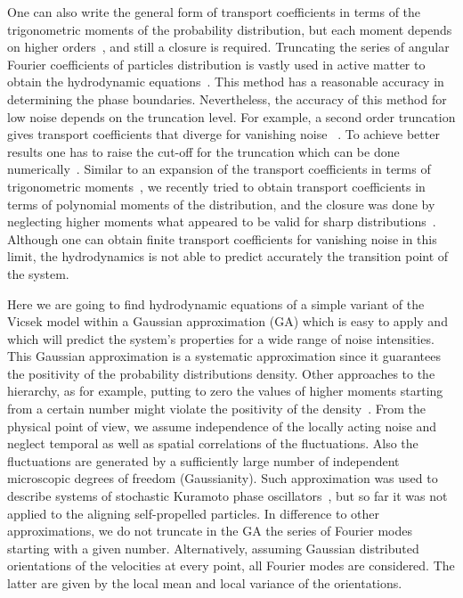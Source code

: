 \documentclass[reprint,floatfix,amsmath,amssymb,aps,pre,showkeys,showpacs,superscriptaddress]{revtex4-1}
\begin{document}
One can also write the general form of transport coefficients in terms of the trigonometric moments of the probability distribution, but each moment depends on higher orders~\cite{romanczuk2012swarming,romanczuk2012mean,Grossmann2012}, and still a closure is required. Truncating the series of angular Fourier coefficients of particles distribution is vastly used in active matter to obtain the hydrodynamic equations~\cite{Farrell2012,Grossmann2014,Yang2015,allaei2016}. This method has a reasonable accuracy in determining the phase boundaries. Nevertheless, the accuracy of this method for low noise depends on the truncation level. For example, a second order truncation gives transport coefficients that diverge for vanishing noise ~\cite{Farrell2012,allaei2016,Yang2015}. To achieve better results one has to raise the cut-off for the truncation which can be done numerically~\cite{Grossmann2013}. Similar to an expansion of the transport coefficients in terms of trigonometric moments~\cite{romanczuk2012swarming,romanczuk2012mean,Grossmann2012}, we recently tried to obtain transport coefficients in terms of polynomial moments of the distribution, and the closure was done by neglecting higher moments what appeared to be valid for sharp distributions~\cite{allaei2016}. Although one can obtain finite transport coefficients for vanishing noise in this limit, the hydrodynamics is not able to predict accurately the transition point of the system.

Here we are going to find hydrodynamic equations of a simple variant of the Vicsek model within a Gaussian approximation (GA) which is easy to apply and which will predict the system's properties for a wide range of noise intensities. This Gaussian approximation is a systematic approximation since it guarantees the positivity of the probability distributions density. Other approaches to  the hierarchy,  as for example, putting to zero the values of higher moments starting from a certain number might violate the positivity of the density~\cite{Hanggi1980}. From the physical point of view, we assume independence of the locally acting noise and neglect temporal as well as spatial correlations of the fluctuations. Also the fluctuations are generated by a sufficiently large number of independent microscopic degrees of freedom (Gaussianity). Such approximation was used to describe systems of stochastic Kuramoto phase oscillators~\cite{sonnenschein2013approximate,sonnenschein2013excitable,sonnenschein2014cooperative,Sonnenschein2015}, but so far  it  was not applied to the aligning self-propelled particles. In difference to other approximations, we do not truncate in the GA the series of Fourier modes starting with a given number. Alternatively, assuming Gaussian distributed orientations of the velocities at every point, all Fourier modes are considered. The latter are given by the local mean and local variance of the orientations.
\end{document}
